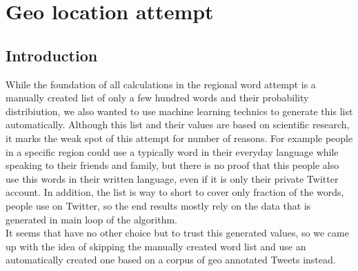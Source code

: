 \documentclass[../Main.tex]{subfiles}
\begin{document}
\section{Geo location attempt }
\subsection{Introduction}
While the foundation of all calculations in the regional word attempt is a manually created list of only a few hundred words and their probability distribiution, we also wanted to use machine learning technics to generate this list automatically.
Although this list and their values are based on scientific research, it marks the weak spot of this attempt for number of reasons. For example people in a specific region could use a typically word in their everyday language while speaking to their friends and family, but there is no proof that this people also use this words in their written language, even if it is only their private Twitter account. In addition, the list is way to short to cover only fraction of the words, people use on Twitter, so the end results mostly rely on the data that is generated in main loop of the algorithm. \\
It seems that have no other choice but to trust this generated values, so we came up with the idea of skipping the manually created word list and use an automatically created one based on a corpus of geo annotated Tweets instead. 
\end{document}

